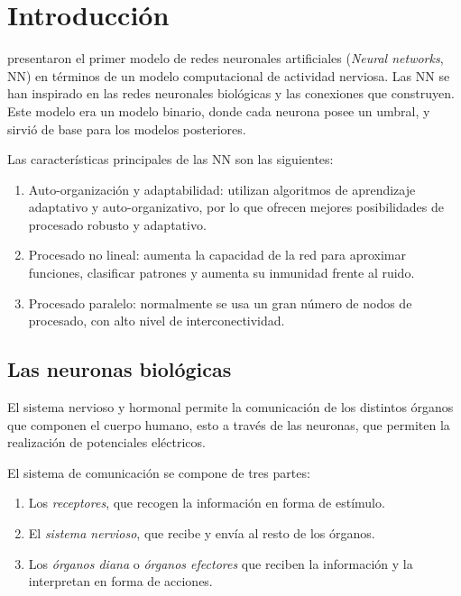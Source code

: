 

\chapter{Introducción}
 presentaron el primer modelo de redes neuronales artificiales ({\em Neural networks}, NN) en términos de un modelo computacional de actividad nerviosa. Las NN se han inspirado en las redes neuronales biológicas y las conexiones que construyen. Este modelo era un modelo binario, donde cada neurona posee un umbral, y sirvió de base para los modelos posteriores.

Las características principales de las NN son las siguientes:
\begin{enumerate}
	\item Auto-organización y adaptabilidad: utilizan algoritmos de aprendizaje adaptativo y auto-organizativo, por lo que ofrecen mejores posibilidades de procesado robusto y adaptativo.

	\item Procesado no lineal: aumenta la capacidad de la red para aproximar funciones, clasificar patrones y aumenta su inmunidad frente al ruido.

	\item Procesado paralelo: normalmente se usa un gran número de nodos de procesado, con alto nivel de interconectividad.
\end{enumerate}

\section{Las neuronas biológicas}
El sistema nervioso y hormonal permite la comunicación de los distintos órganos que componen el cuerpo humano, esto a través de las neuronas, que permiten la realización de potenciales eléctricos.

El sistema de comunicación se compone de tres partes:
\begin{enumerate}
    \item Los {\em receptores}, que recogen la información en forma de estímulo.
    \item El {\em sistema nervioso}, que recibe y envía al resto de los órganos.
    \item Los {\em órganos diana} o {\em órganos efectores} que reciben la información y la interpretan en forma de acciones.
\end{enumerate}

